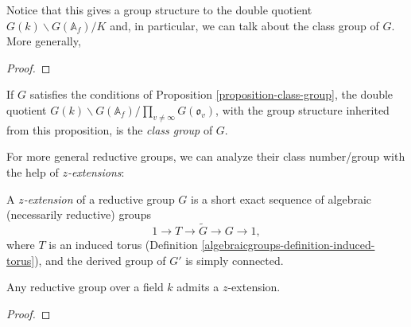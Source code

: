 Notice that this gives a group structure to the double quotient $G(k)\backslash G(\mathbb A_f)/K$ and, in particular, we can talk about the class group of $G$. More generally, 

\begin{proposition}
 \label{proposition-class-group}
 \cite[Proposition 8.8]{Platonov-Rapinchuk}
\end{proposition}

\begin{proof}
 
\end{proof}


\begin{definition}
 \label{definition-class-group}
If $G$ satisfies the conditions of Proposition \ref{proposition-class-group}, the double quotient $G(k)\backslash G(\mathbb A_f)/\prod_{v\ne \infty} G(\mathfrak o_v)$, with the group structure inherited from this proposition, is the {\it class group} of $G$. 
\end{definition}

For more general reductive groups, we can analyze their class number/group with the help of \emph{$z$-extensions}:

\begin{definition}
 \label{definition-z-extention}
A {\it $z$-extension} of a reductive group $G$ is a short exact sequence of algebraic (necessarily reductive) groups
$$ 1\to T\to \tilde G\to G\to 1,$$
where $T$ is an induced torus (Definition \ref{algebraicgroups-definition-induced-torus}), and the derived group of $G'$ is simply connected.
\end{definition}

\begin{proposition}
 \label{proposition-z-extension-exists}
Any reductive group over a field $k$ admits a $z$-extension.
\end{proposition}


\begin{proof}
\end{proof}














